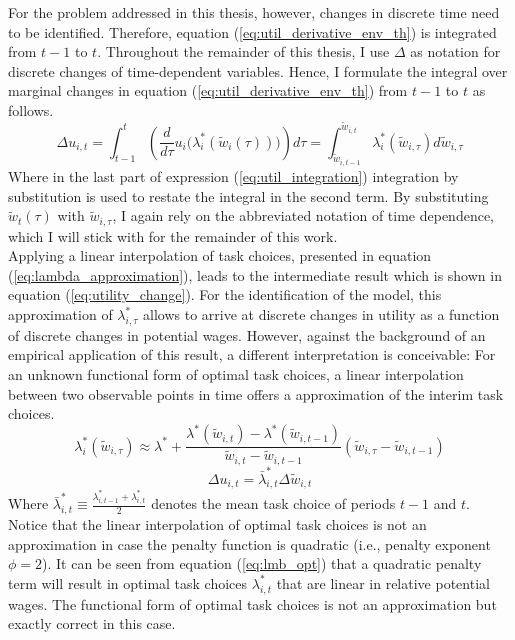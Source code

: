 \documentclass[../main.tex]{subfiles}
\begin{document}
For the problem addressed in this thesis, however, changes in discrete time need to be identified. Therefore, equation (\ref{eq:util_derivative_env_th}) is integrated from $t-1$ to $t$. Throughout the remainder of this thesis, I use $\Delta$ as notation for discrete changes of time-dependent variables. Hence, I formulate the integral over marginal changes in equation (\ref{eq:util_derivative_env_th}) from $t-1$ to $t$ as follows. 
\begin{equation} \label{eq:util_integration}
	\Delta u_{i,t} = \int^t_{t-1} \left( \frac{d}{d \tau} u_i\big(\lambda_i^*(\tilde{w}_i(\tau))\big) \right) d\tau = \int^{\tilde{w}_{i,t}}_{\tilde{w}_{i,t-1}} \lambda_i^*(\tilde{w}_{i, \tau}) d\tilde{w}_{i, \tau}
\end{equation}
Where in the last part of expression (\ref{eq:util_integration}) integration by substitution is used to restate the integral in the second term. By substituting $\tilde{w}_t(\tau)$ with $\tilde{w}_{i,\tau}$, I again rely on the abbreviated notation of time dependence, which I will stick with for the remainder of this work. 
\\
Applying a linear interpolation of task choices, presented in equation (\ref{eq:lambda_approximation}), leads to the intermediate result which is shown in equation (\ref{eq:utility_change}). For the identification of the model, this approximation of $\lambda_{i,\tau}^*$ allows to arrive at discrete changes in utility as a function of discrete changes in potential wages. However, against the background of an empirical application of this result, a different interpretation is conceivable: For an unknown functional form of optimal task choices, a linear interpolation between two observable points in time offers a approximation of the interim task choices.
\begin{equation} \label{eq:lambda_approximation}
	\lambda^*_i(\tilde{w}_{i,\tau}) \approx \lambda^* + \frac{\lambda^*(\tilde{w}_{i,t}) - \lambda^*(\tilde{w}_{i,t-1})}{\tilde{w}_{i,t} - \tilde{w}_{i,t-1}} (\tilde{w}_{i,\tau} - \tilde{w}_{i,t-1})
\end{equation}
\begin{equation} \label{eq:utility_change}
	\Delta u_{i,t} = \bar{\lambda}_{i,t}^* \Delta \tilde{w}_{i,t}
\end{equation}
Where $\bar{\lambda}_{i,t}^* \equiv \frac{\lambda_{i,t-1}^* + \lambda_{i,t}^*}{2}$ denotes the mean task choice of periods $t-1$ and $t$. Notice that the linear interpolation of optimal task choices is not an approximation in case the penalty function is quadratic (i.e., penalty exponent $\phi = 2$). It can be seen from equation (\ref{eq:lmb_opt}) that a quadratic penalty term will result in optimal task choices $\lambda_{i,t}^*$ that are linear in relative potential wages. The functional form of optimal task choices is not an approximation but exactly correct in this case.
\end{document}
